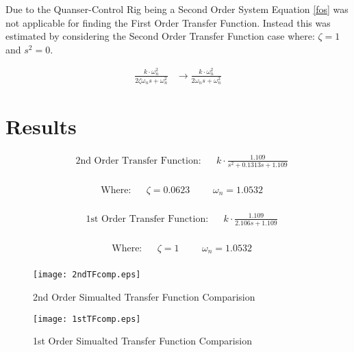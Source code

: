 Due to the Quanser-Control Rig being a Second Order System Equation
\ref{fos} was not applicable for finding the First Order Transfer
Function. Instead this was estimated by considering the Second Order
Transfer Function case where: \(\zeta =1\) and \(s^2=0\).

\begin{align}
\frac { k\cdot \omega_{ n }^{ 2 } }{ 2\zeta \omega_{ n }s+\omega_{ n }^{ 2 } } &\rightarrow \frac { k\cdot \omega_{ n }^{ 2 } }{ 2\omega_{ n }s+\omega_{ n }^{ 2 } }
\end{align}

\section{Results}\label{results}

\begin{align}
&\text{2nd Order Transfer Function}: && k \cdot \frac { 1.109 }{ s^{ 2 }+0.1313s+1.109 }
\end{align}

\begin{align*}
\\
&\text{Where:} &&\zeta = 0.0623 &&& \omega_n = 1.0532
\\
\end{align*}

\begin{align}
&\text{1st Order Transfer Function}: && k \cdot \frac { 1.109 }{ 2.106s+1.109 }
\end{align}

\begin{align*}
\\
&\text{Where:} &&\zeta = 1 &&& \omega_n = 1.0532
\\
\end{align*}

\begin{figure}[H]
\centering
\begin{minipage}{.49\textwidth}
\centering
\texttt{[image: 2ndTFcomp.eps]}
\caption{2nd Order Simualted Transfer Function Comparision}
\label{2ndTFcomp}
\end{minipage}
\hfill
\begin{minipage}{.49\textwidth}
  \centering
  \texttt{[image: 1stTFcomp.eps]}
  \caption{1st Order Simualted Transfer Function Comparision}
  \label{1stTFcomp}
\end{minipage}
\end{figure}

